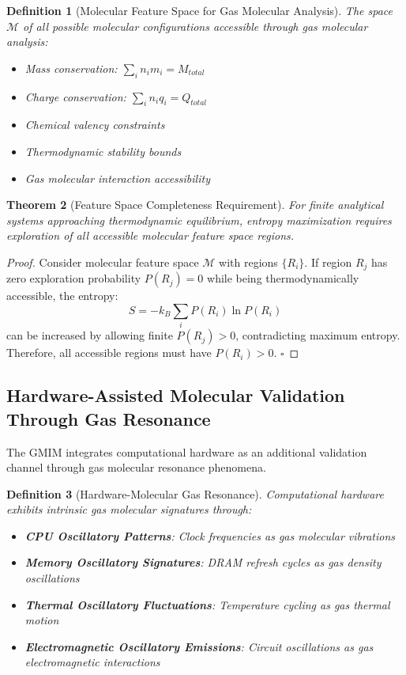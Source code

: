 \documentclass[11pt,a4paper]{article}
\newtheorem{theorem}{Theorem}[section]
\newtheorem{definition}[theorem]{Definition}
\theoremstyle{remark}
\begin{document}
\begin{definition}[Molecular Feature Space for Gas Molecular Analysis]
The space $\mathcal{M}$ of all possible molecular configurations accessible through gas molecular analysis:
\begin{itemize}
\item Mass conservation: $\sum_i n_i m_i = M_{total}$
\item Charge conservation: $\sum_i n_i q_i = Q_{total}$
\item Chemical valency constraints
\item Thermodynamic stability bounds
\item Gas molecular interaction accessibility
\end{itemize}
\end{definition}

\begin{theorem}[Feature Space Completeness Requirement]
For finite analytical systems approaching thermodynamic equilibrium, entropy maximization requires exploration of all accessible molecular feature space regions.
\end{theorem}

\begin{proof}
Consider molecular feature space $\mathcal{M}$ with regions $\{R_i\}$. If region $R_j$ has zero exploration probability $P(R_j) = 0$ while being thermodynamically accessible, the entropy:
$$S = -k_B \sum_i P(R_i) \ln P(R_i)$$
can be increased by allowing finite $P(R_j) > 0$, contradicting maximum entropy. Therefore, all accessible regions must have $P(R_i) > 0$. $\square$
\end{proof}

\subsection{Hardware-Assisted Molecular Validation Through Gas Resonance}

The GMIM integrates computational hardware as an additional validation channel through gas molecular resonance phenomena.

\begin{definition}[Hardware-Molecular Gas Resonance]
Computational hardware exhibits intrinsic gas molecular signatures through:
\begin{itemize}
\item \textbf{CPU Oscillatory Patterns}: Clock frequencies as gas molecular vibrations
\item \textbf{Memory Oscillatory Signatures}: DRAM refresh cycles as gas density oscillations
\item \textbf{Thermal Oscillatory Fluctuations}: Temperature cycling as gas thermal motion
\item \textbf{Electromagnetic Oscillatory Emissions}: Circuit oscillations as gas electromagnetic interactions
\end{itemize}
\end{definition}
\end{document}
